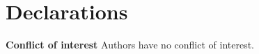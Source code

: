 \documentclass[pdflatex,sn-mathphys-num]{sn-jnl}%
\theoremstyle{definition} %
\theoremstyle{remark} %
\begin{document}
\section*{Declarations} 
\textbf{Conflict of interest} 
Authors have no conflict of interest.



\end{document}
